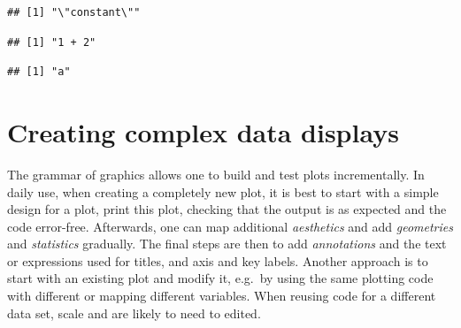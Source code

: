 \documentclass[krantz2]{krantz}\usepackage{knitr}%
\begin{document}
\begin{knitrout}\footnotesize
{}\color{fgcolor}\begin{kframe}
\begin{alltt}
 \hlkwb{<-} \hlstd{(}\hlstd{) \{}
  \hlstd{(}\hlstd{(}
\hlstd{\}}

 \hlkwb{<-} 

\hlstd{(}\hlstd{)}
\end{alltt}
\begin{verbatim}
## [1] "\"constant\""
\end{verbatim}
\begin{alltt}
\hlstd{(} \hlopt{+} \hlstd{)}
\end{alltt}
\begin{verbatim}
## [1] "1 + 2"
\end{verbatim}
\begin{alltt}
\end{alltt}
\begin{verbatim}
## [1] "a"
\end{verbatim}
\end{kframe}
\end{knitrout}

\section{Creating complex data displays}\label{sec:plot:composition}

The grammar of graphics allows one to build and test plots incrementally. In daily use, when creating a completely new plot, it is best to start with a simple design for a plot, print this plot, checking that the output is as expected and the code error-free. Afterwards, one can map additional \emph{aesthetics} and add \emph{geometries} and \emph{statistics} gradually. The final steps are then to add \emph{annotations} and the text or expressions used for titles, and axis and key labels. Another approach is to start with an existing plot and modify it, e.g.\ by using the same plotting code with different  or mapping different variables. When reusing code for a different data set, scale  and  are likely to need to edited.
\end{document}
